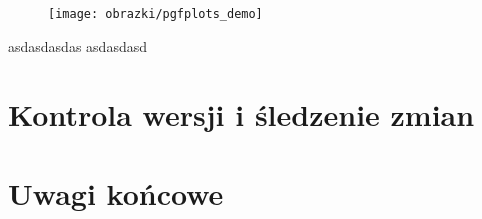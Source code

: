\begin{figure}[!htb]
\texttt{[image: obrazki/pgfplots\_demo]}
\end{figure}

asdasdasdas asdasdasd

\section{Kontrola wersji i śledzenie zmian}

\section{Uwagi końcowe}
